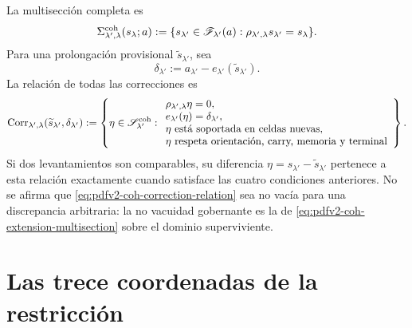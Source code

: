 La multisección completa es
\begin{equation}\label{eq:pdfv2-coh-extension-multisection}
 \Sigma_{\lambda',\lambda}^{\rm coh}(s_\lambda;a)
 :=\{s_{\lambda'}\in\mathscr F_{\lambda'}(a):
 \rho_{\lambda',\lambda}s_{\lambda'}=s_\lambda\}.
\end{equation}
Para una prolongación provisional \(\widetilde s_{\lambda'}\), sea
\begin{equation}\label{eq:pdfv2-coh-discrepancy}
 \delta_{\lambda'}:=
 a_{\lambda'}-e_{\lambda'}(\widetilde s_{\lambda'}).
\end{equation}
La relación de todas las correcciones es
\begin{equation}\label{eq:pdfv2-coh-correction-relation}
 \operatorname{Corr}_{\lambda',\lambda}
 (\widetilde s_{\lambda'},\delta_{\lambda'})
 :=\left\{\eta\in\mathscr S_{\lambda'}^{\rm coh}:
 \begin{array}{l}
 \rho_{\lambda',\lambda}\eta=0,\\
 e_{\lambda'}(\eta)=\delta_{\lambda'},\\
 \eta\text{ está soportada en celdas nuevas},\\
 \eta\text{ respeta orientación, carry, memoria y terminal}
 \end{array}
 \right\}.
\end{equation}
Si dos levantamientos son comparables, su diferencia
\(\eta=s_{\lambda'}-\widetilde s_{\lambda'}\) pertenece a esta relación
exactamente cuando satisface las cuatro condiciones anteriores. No se afirma
que \eqref{eq:pdfv2-coh-correction-relation} sea no vacía para una
discrepancia arbitraria: la no vacuidad gobernante es la de
\eqref{eq:pdfv2-coh-extension-multisection} sobre el dominio superviviente.

\iffalse
\section{Las trece coordenadas de la restricción}
\label{sec:pdfv2-coh-thirteen}

